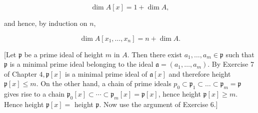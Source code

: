 \documentclass{standalone}
\theoremstyle{definition}
\theoremstyle{remark}
\begin{document}
\[
\operatorname{dim} A[x]=1+\operatorname{dim} A,
\]

and hence, by induction on $n$,

\[
\operatorname{dim} A\left[x_{1}, \ldots, x_{n}\right]=n+\operatorname{dim} A .
\]

[Let $\mathfrak{p}$ be a prime ideal of height $m$ in $A$. Then there exist $a_{1}, \ldots, a_{m} \in \mathfrak{p}$ such that $\mathfrak{p}$ is a minimal prime ideal belonging to the ideal $\mathfrak{a}=\left(a_{1}, \ldots, a_{m}\right)$. By Exercise 7 of Chapter $4, \mathfrak{p}[x]$ is a minimal prime ideal of $\mathfrak{a}[x]$ and therefore height $\mathfrak{p}[x] \leqslant m$. On the other hand, a chain of prime ideals $p_{0} \subset \mathfrak{p}_{1} \subset \ldots \subset \mathfrak{p}_{m}=\mathfrak{p}$ gives rise to a chain $\mathfrak{p}_{0}[x] \subset \cdots \subset \mathfrak{p}_{m}[x]=\mathfrak{p}[x]$, hence height $\mathfrak{p}[x] \geqslant m$. Hence height $\mathfrak{p}[x]=$ height $\mathfrak{p}$. Now use the argument of Exercise 6.]
\end{document}
